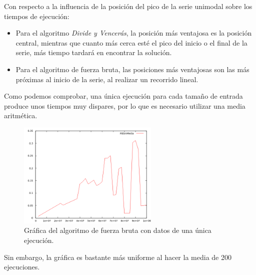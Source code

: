 \documentclass[11pt,a4paper]{article}
\begin{document}
			\par
			Con respecto a la influencia de la posición del pico de la serie unimodal sobre los tiempos de ejecución:

			\begin{itemize}

				\item
				Para el algoritmo \textit{Divide y Vencerás}, la posición más ventajosa es la posición central, mientras que cuanto más cerca esté el pico del inicio o el final de la serie, más tiempo tardará en encontrar la solución.

				\item
				Para el algoritmo de fuerza bruta, las posiciones más ventajosas son las más próximas al inicio de la serie, al realizar un recorrido lineal.

			\end{itemize}

\newpage

			\par
			Como podemos comprobar, una única ejecución para cada tamaño de entrada produce unos tiempos muy dispares, por lo que es necesario utilizar una media aritmética.

			\begin{figure}[h]

				\centering
				\includegraphics[width=0.6\textwidth]{fbmal.png}
				\caption{Gráfica del algoritmo de fuerza bruta con datos de una única ejecución.}

			\end{figure}

			\par
			Sin embargo, la gráfica es bastante más uniforme al hacer la media de 200 ejecuciones.
\end{document}
